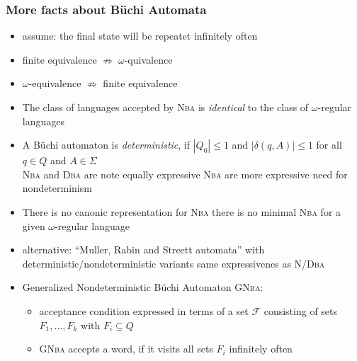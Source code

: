 \documentclass[a4paper, 10pt]{article}
\begin{document}
\subsubsection*{More facts about Büchi Automata}
\begin{itemize}
    \item assume: the final state will be repeatet infinitely often
    \item finite equivalence $\not\Rightarrow\;\omega$-quivalence
    \item $\omega$-equivalence $\not\Rightarrow$ finite equivalence
    \item The class of languages accepted by \textsc{Nba} is \emph{identical} to the class of $\omega$-regular languages
    \item A Büchi automaton is \emph{deterministic}, if $|Q_0|\leq 1$ and $|\delta(q,A)|\leq1$ for all $q\in Q$ and $A\in\Sigma$ \\
    \textsc{Nba} and \textsc{Dba} are note equally expressive \follows \textsc{Nba} are more expressive \follows need for nondeterminism
    \item There is no canonic representation for \textsc{Nba} \follows there is no minimal \textsc{Nba} for a given $\omega$-regular language
    \item alternative: ``Muller, Rabin and Streett automata'' with deterministic/nondeterministic variants \follows same expressivenes as \textsc{N/Dba}
    \item Generalized Nondeterministic Büchi Automaton \textsc{GNba}:
    \begin{itemize}
        \item acceptance condition expressed in terms of a set $\mathcal{F}$ consisting of sets $F_1,\dots,F_k$ with $F_i\subseteq Q$
        \item \textsc{GNba} accepts a word, if it visits all sets $F_i$ infinitely often
    \end{itemize}
\end{itemize}
\end{document}
